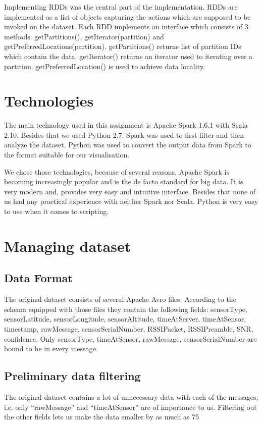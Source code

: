 \documentclass{vldb}
\begin{document}
Implementing RDDs was the central part of the implementation. 
RDDs are implemented as a list of objects capturing the actions which 
are supposed to be invoked on the dataset. Each RDD implements an 
interface which consists of 3 methods: getPartitions(), getIterator(partition) 
and getPreferredLocations(partition). getPartitions() returns list of partition 
IDs which contain the data. getIterator() returns an iterator used to iterating 
over a partition. getPreferredLocation() is used to achieve data locality.

\section{Technologies}
The main technology used in this assignment is Apache Spark 1.6.1 with Scala 2.10. 
Besides that we used Python 2.7. Spark was used to first filter and then analyze the dataset. 
Python was used to convert the output data from Spark to the format suitable for our visualisation.

We chose those technologies, because of several reasons. 
Apache Spark is becoming increasingly popular and is the de facto standard for big data. 
It is very modern and, provides very easy and intuitive interface. 
Besides that none of us had any practical experience with neither Spark nor Scala. 
Python is very easy to use when it comes to scripting.

\section{Managing dataset}
\subsection{Data Format}
The original dataset consists of several Apache Avro files. 
According to the schema equipped with those files they contain the following fields: sensorType, sensorLatitude, 
sensorLongitude, sensorAltitude, timeAtServer, timeAtSensor, timestamp, rawMessage, sensorSerialNumber, RSSIPacket, 
RSSIPreamble, SNR, confidence. Only sensorType, timeAtSensor, rawMessage, sensorSerialNumber are bound to be in every message.

\subsection{Preliminary data filtering}
The original dataset contains a lot of unnecessary data with each of the messages,
 i.e. only “rawMessage” and “timeAtSensor” are of importance to us. 
Filtering out the other fields lets us make the data smaller by as much as 75%
\end{document}
